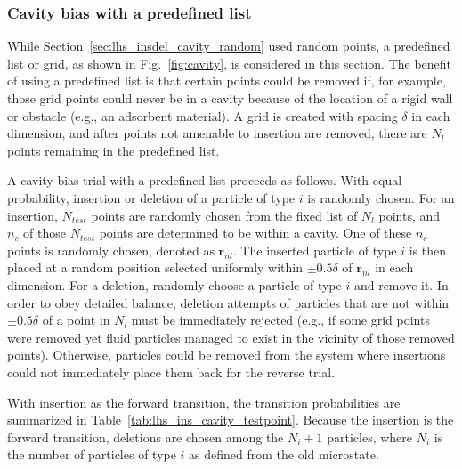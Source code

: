 \documentclass[
  9pt,
  bestpractices,
]{livecoms}
\begin{document}
\subsubsection{\label{sec:lhs_insdel_cavity_testpoint}Cavity bias with a predefined list}

While Section~\ref{sec:lhs_insdel_cavity_random} used random points, a predefined list or grid, as shown in Fig.~\ref{fig:cavity}, is considered in this section.
The benefit of using a predefined list is that certain points could be removed if, for example, those grid points could never be in a cavity because of the location of a rigid wall or obstacle (e.g., an adsorbent material).
A grid is created with spacing $\delta$ in each dimension, and after points not amenable to insertion are removed, there are $N_l$ points remaining in the predefined list.

A cavity bias trial with a predefined list proceeds as follows.
With equal probability, insertion or deletion of a particle of type $i$ is randomly chosen.
For an insertion, $N_{test}$ points are randomly chosen from the fixed list of $N_l$ points, and $n_c$ of those $N_{test}$ points are determined to be within a cavity.
One of these $n_c$ points is randomly chosen, denoted as $\mathbf{r}_{nl}$.
The inserted particle of type $i$ is then placed at a random position selected uniformly within $\pm 0.5\delta$ of $\mathbf{r}_{nl}$ in each dimension.
For a deletion, randomly choose a particle of type $i$ and remove it.
In order to obey detailed balance, deletion attempts of particles that are not within $\pm 0.5\delta$ of a point in $N_l$ must be immediately rejected (e.g., if some grid points were removed yet fluid particles managed to exist in the vicinity of those removed points).
Otherwise, particles could be removed from the system where insertions could not immediately place them back for the reverse trial.

With insertion as the forward transition, the transition probabilities are summarized in Table~\ref{tab:lhs_ins_cavity_testpoint}.
Because the insertion is the forward transition, deletions are chosen among the $N_i+1$ particles, where $N_i$ is the number of particles of type $i$ as defined from the old microstate.
\end{document}
